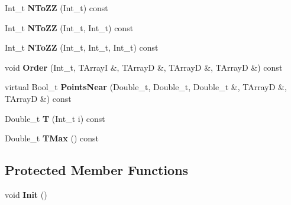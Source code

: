 \begin{DoxyCompactItemize}
\item 
\hypertarget{classTZigZag_a1708c58772b8fd79c836be4ffa27aed7}{Int\-\_\-t {\bfseries N\-To\-Z\-Z} (Int\-\_\-t) const }\label{classTZigZag_a1708c58772b8fd79c836be4ffa27aed7}

\item 
\hypertarget{classTZigZag_aa0a95dca9808abb4ba5be9ea51592cff}{Int\-\_\-t {\bfseries N\-To\-Z\-Z} (Int\-\_\-t, Int\-\_\-t) const }\label{classTZigZag_aa0a95dca9808abb4ba5be9ea51592cff}

\item 
\hypertarget{classTZigZag_ae13318defac4d0b8be119c3101c17012}{Int\-\_\-t {\bfseries N\-To\-Z\-Z} (Int\-\_\-t, Int\-\_\-t, Int\-\_\-t) const }\label{classTZigZag_ae13318defac4d0b8be119c3101c17012}

\item 
\hypertarget{classTZigZag_aa96dccdcfcb58ec5f4f391d9fbbf70ec}{void {\bfseries Order} (Int\-\_\-t, T\-Array\-I \&, T\-Array\-D \&, T\-Array\-D \&, T\-Array\-D \&) const }\label{classTZigZag_aa96dccdcfcb58ec5f4f391d9fbbf70ec}

\item 
\hypertarget{classTZigZag_a6ff0c7f8127bc2ddea94034d4f8cd26a}{virtual Bool\-\_\-t {\bfseries Points\-Near} (Double\-\_\-t, Double\-\_\-t, Double\-\_\-t \&, T\-Array\-D \&, T\-Array\-D \&) const }\label{classTZigZag_a6ff0c7f8127bc2ddea94034d4f8cd26a}

\item 
\hypertarget{classTZigZag_a564a372167ee1877aae7a8d85409c051}{Double\-\_\-t {\bfseries T} (Int\-\_\-t i) const }\label{classTZigZag_a564a372167ee1877aae7a8d85409c051}

\item 
\hypertarget{classTZigZag_a30ccf1139de2d6ff16b0132161e8a360}{Double\-\_\-t {\bfseries T\-Max} () const }\label{classTZigZag_a30ccf1139de2d6ff16b0132161e8a360}

\end{DoxyCompactItemize}
\subsection*{Protected Member Functions}
\begin{DoxyCompactItemize}
\item 
\hypertarget{classTZigZag_adfd95ecde4a66eb935354ebea146637c}{void {\bfseries Init} ()}\label{classTZigZag_adfd95ecde4a66eb935354ebea146637c}

\end{DoxyCompactItemize}
